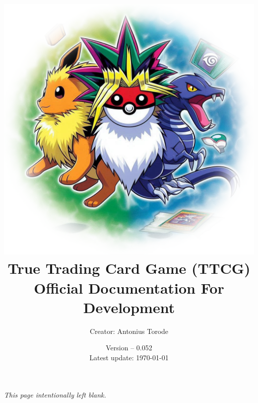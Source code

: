 \documentclass[openany,a4paper,10pt]{book}
\title{\vspace{0.1cm}  \includegraphics[scale=0.5]{./images/man_cover.png} \vspace{.5cm} \\ True Trading Card Game (TTCG) \\ Official Documentation For Development}
\author{Creator: Antonius Torode}
\date{Version -- 0.052 \\ Latest update: \today}
\begin{document}
\frontmatter
\maketitle

\tableofcontents
\newpage
\vspace*{\fill}
\begin{center}
	\textit{This page intentionally left blank.}
\end{center}
\vspace*{\fill}

\mainmatter
\pagestyle{fancy}
\fancyhf{}
\fancyhead[RO, LE]{\thepage}










\backmatter


\printindex
\end{document}
